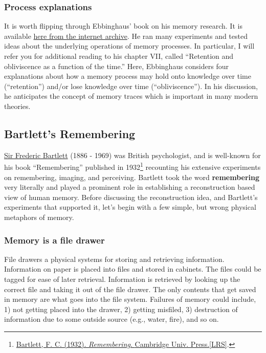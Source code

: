 \documentclass[
  oneside,
  12pt]{crumpbook}
\begin{document}
\hypertarget{process-explanations}{%
\subsubsection{Process explanations}\label{process-explanations}}

It is worth flipping through Ebbinghaus' book on his memory research. It is available \href{https://archive.org/details/memorycontributi00ebbiuoft}{here from the internet archive}. He ran many experiments and tested ideas about the underlying operations of memory processes. In particular, I will refer you for additional reading to his chapter VII, called ``Retention and obliviscence as a function of the time.'' Here, Ebbinghaus considers four explanations about how a memory process may hold onto knowledge over time (``retention'') and/or lose knowledge over time (``obliviscence''). In his discussion, he anticipates the concept of memory traces which is important in many modern theories.

\hypertarget{bartletts-remembering}{%
\subsection{Bartlett's Remembering}\label{bartletts-remembering}}

\href{https://en.wikipedia.org/wiki/Frederic_Bartlett}{Sir Frederic Bartlett} (1886 - 1969) was British psychologist, and is well-known for his book ``Remembering'' published in 1932\footnote{\protect\hyperlink{ref-bartlettRemembering1932}{Bartlett, F. C. (1932). \emph{Remembering}. {Cambridge Univ. Press.{[}LRS{]}}}.} recounting his extensive experiments on remembering, imaging, and perceiving. Bartlett took the word \textbf{remembering} very literally and played a prominent role in establishing a reconstruction based view of human memory. Before discussing the reconstruction idea, and Bartlett's experiments that supported it, let's begin with a few simple, but wrong physical metaphors of memory.

\hypertarget{memory-is-a-file-drawer}{%
\subsubsection{Memory is a file drawer}\label{memory-is-a-file-drawer}}

File drawers a physical systems for storing and retrieving information. Information on paper is placed into files and stored in cabinets. The files could be tagged for ease of later retrieval. Information is retrieved by looking up the correct file and taking it out of the file drawer. The only contents that get saved in memory are what goes into the file system. Failures of memory could include, 1) not getting placed into the drawer, 2) getting misfiled, 3) destruction of information due to some outside source (e.g., water, fire), and so on.
\end{document}
